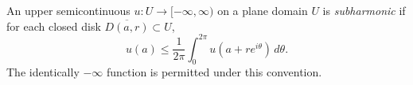 
An upper semicontinuous $u:U\to[-\infty,\infty)$ on a plane domain $U$ is \emph{subharmonic} if for each closed disk $\overline{D(a,r)}\subset U$,
\[
u(a)\le\frac{1}{2\pi}\int_0^{2\pi}u(a+re^{i\theta})\,d\theta.
\]
The identically $-\infty$ function is permitted under this convention.
